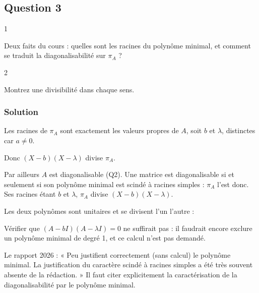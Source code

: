 \documentclass[11pt,a4paper]{article}
\newcommand{\equationajustee}[1]{%
  \sbox{\boiteequation}{$\displaystyle #1$}%
  \ifdim\wd\boiteequation>\linewidth
    \[\resizebox{\linewidth}{!}{\usebox{\boiteequation}}\]%
  \else
    \[#1\]%
  \fi}
\begin{document}
\hypertarget{question-3}{%
\subsection{Question 3}\label{question-3}}

\begin{indication}{1}

Deux faits du cours : quelles sont les racines du polynôme minimal, et comment se traduit la diagonalisabilité sur \(\pi_A\) ?

\end{indication}

\begin{indication}{2}

Montrez une divisibilité dans chaque sens.

\end{indication}

\hypertarget{solution-2}{%
\subsubsection{Solution}\label{solution-2}}

Les racines de \(\pi_A\) sont exactement les valeurs propres de \(A\), soit \(b\) et \(\lambda\), distinctes car \(a\neq0\).

Donc \((X-b)(X-\lambda)\) divise \(\pi_A\).

Par ailleurs \(A\) est diagonalisable (Q2). Une matrice est diagonalisable si et seulement si son polynôme minimal est scindé à racines simples : \(\pi_A\) l'est donc. Ses racines étant \(b\) et \(\lambda\), \(\pi_A\) divise \((X-b)(X-\lambda)\).

Les deux polynômes sont unitaires et se divisent l'un l'autre :
\equationajustee{\boxed{\pi_A=(X-b)(X-3a-b).}}

\begin{piege}

Vérifier que \((A-bI)(A-\lambda I)=0\) ne suffirait pas : il faudrait encore exclure un polynôme minimal de degré 1, et ce calcul n'est pas demandé.

\end{piege}

\begin{jury}

Le rapport 2026 : « Peu justifient correctement (sans calcul) le polynôme minimal. La justification du caractère scindé à racines simples a été très souvent absente de la rédaction. » Il faut citer explicitement la caractérisation de la diagonalisabilité par le polynôme minimal.

\end{jury}
\end{document}
